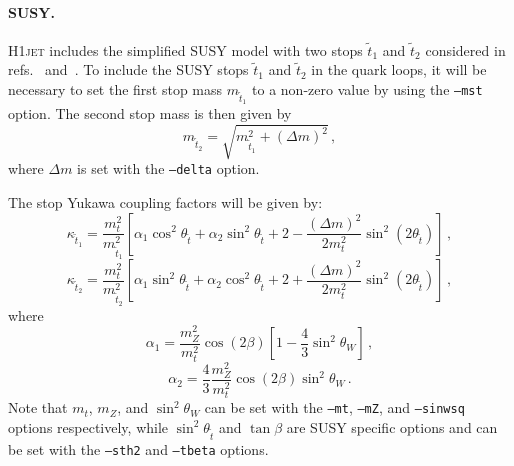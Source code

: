 \documentclass[12pt]{article}
\begin{document}
\paragraph{SUSY.} \textsc{H1jet} includes the simplified SUSY model with
two stops $\tilde{t}_1$ and $\tilde{t}_2$ considered in refs.~\cite{Gunion:2002zf} and~\cite{Banfi:2018pki}. To include the SUSY stops $\tilde{t}_1$ and
$\tilde{t}_2$ in the quark loops, it will be necessary to set the
first stop mass $m_{\tilde{t}_1}$ to a non-zero value by using the
\texttt{--mst} option. The second stop mass is then given by
\begin{equation}
	m_{\tilde{t}_2} = \sqrt{m_{\tilde{t}_1}^2 + (\Delta m)^2} \,,
\end{equation}
where $\Delta m$ is set with the \texttt{--delta} option. 

The stop Yukawa coupling factors will be given by: 
\begin{equation}
   \kappa_{\tilde{t}_1} = \frac{m_t^2}{m_{\tilde{t}_1}^2} \left [ \alpha_1 \cos^2 \theta_{\tilde{t}} + \alpha_2 \sin^2 \theta_{\tilde{t}} + 2 - \frac{(\Delta m)^2}{2 m_t^2} \sin^2\left ( 2 \theta_{\tilde{t}} \right ) \right ] \,,
\end{equation} 
\begin{equation}
   \kappa_{\tilde{t}_2} = \frac{m_t^2}{m_{\tilde{t}_2}^2} \left [ \alpha_1 \sin^2 \theta_{\tilde{t}} + \alpha_2 \cos^2 \theta_{\tilde{t}} + 2 + \frac{(\Delta m)^2}{2 m_t^2} \sin^2\left ( 2 \theta_{\tilde{t}} \right ) \right ] \,, 
\end{equation} 
where 
\begin{equation}
   \alpha_1 = \frac{m_Z^2}{m_t^2} \cos \left ( 2 \beta \right ) \left [ 1 - \frac{4}{3} \sin^2\theta_W \right ] \,, 
\end{equation} 
\begin{equation}
   \alpha_2 = \frac{4}{3} \frac{m_Z^2}{m_t^2} \cos \left ( 2 \beta \right ) \sin^2\theta_W \,. 
\end{equation} 
Note that $m_t$, $m_Z$, and $\sin^2\theta_W$ can be set with the \texttt{--mt}, \texttt{--mZ}, and \texttt{--sinwsq} options respectively, while $\sin^2 \theta_{\tilde{t}}$ and $\tan\beta$ are SUSY specific options and can be set with the \texttt{--sth2} and \texttt{--tbeta} options. 
\end{document}
